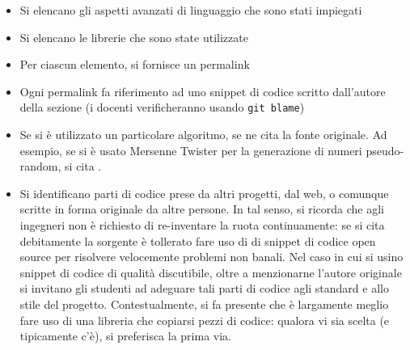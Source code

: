 \documentclass[a4paper,12pt]{report}
\begin{document}
\begin{itemize}
	\item Si elencano gli aspetti avanzati di linguaggio che sono stati impiegati
	\item Si elencano le librerie che sono state utilizzate
	\item Per ciascun elemento, si fornisce un permalink
	\item Ogni permalink fa riferimento ad uno snippet di codice scritto dall'autore della sezione (i docenti verificheranno usando \texttt{git blame})
	\item Se si è utilizzato un particolare algoritmo, se ne cita la fonte originale.
	Ad esempio, se si è usato Mersenne Twister per la generazione di numeri pseudo-random, si cita \cite{mersenne}.
	\item Si identificano parti di codice prese da altri progetti, dal web, o comunque scritte in forma originale da altre persone.
	In tal senso, si ricorda che agli ingegneri non è richiesto di re-inventare la ruota continuamente:
	se si cita debitamente la sorgente è tollerato fare uso di di snippet di codice open source per risolvere velocemente problemi non banali.
	Nel caso in cui si usino snippet di codice di qualità discutibile,
	oltre a menzionarne l'autore originale si invitano gli studenti ad adeguare tali parti di codice agli standard e allo stile del progetto.
	Contestualmente, si fa presente che è largamente meglio fare uso di una libreria che copiarsi pezzi di codice:
	qualora vi sia scelta (e tipicamente c'è), si preferisca la prima via.
\end{itemize}
\end{document}
